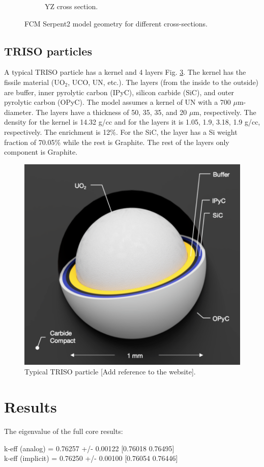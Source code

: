\documentclass[11pt,letterpaper]{article}
\begin{document}
\begin{figure}[H]
\begin{subfigure}[t]{0.4\textwidth}
		\caption{YZ cross section.}
		\label{fig:FCM_yz}
	\end{subfigure}
	\hfill
	\caption{FCM Serpent2 model geometry for different cross-sections.}
	\label{fig:FCM}
\end{figure}

\subsection{TRISO particles}

A typical TRISO particle has a kernel and 4 layers Fig. \ref{fig:triso}. The kernel has the fissile material (UO$_2$, UCO, UN, etc.). The layers (from the inside to the outside) are buffer, inner pyrolytic carbon (IPyC), silicon carbide (SiC), and outer pyrolytic carbon (OPyC).
The model assumes a kernel of UN with a 700 $\mu$m-diameter. The layers have a thickness of 50, 35, 35, and 20 $\mu$m, respectively.
The density for the kernel is 14.32 g/cc and for the layers it is 1.05, 1.9, 3.18, 1.9 g/cc, respectively. The enrichment is 12\%. For the SiC, the layer has a Si weight fraction of 70.05\% while the rest is Graphite. The rest of the layers only component is Graphite.

\begin{figure}[H]
	\centering
	\includegraphics[width=0.5\linewidth]{figures/triso1.png}
	\hfill
	\caption{Typical TRISO particle [Add reference to the website].}
	\label{fig:triso}
\end{figure}

\section{Results}

The eigenvalue of the full core results:

\noindent
k-eff (analog)    = 0.76257 +/- 0.00122  [0.76018  0.76495]\\
\noindent
k-eff (implicit)  = 0.76250 +/- 0.00100  [0.76054  0.76446]
\end{document}
